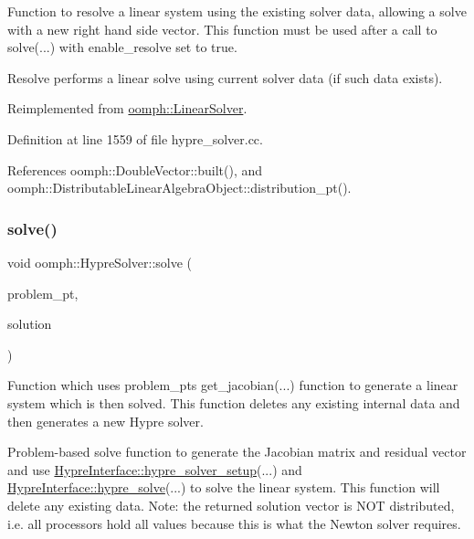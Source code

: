 Function to resolve a linear system using the existing solver data, allowing a solve with a new right hand side vector. This function must be used after a call to solve(...) with enable\+\_\+resolve set to true. 

Resolve performs a linear solve using current solver data (if such data exists). 

Reimplemented from \hyperlink{classoomph_1_1LinearSolver_a3b310d08333033edc119b2a5bd7dcbfb}{oomph\+::\+Linear\+Solver}.



Definition at line 1559 of file hypre\+\_\+solver.\+cc.



References oomph\+::\+Double\+Vector\+::built(), and oomph\+::\+Distributable\+Linear\+Algebra\+Object\+::distribution\+\_\+pt().

\mbox{\label{classoomph_1_1HypreSolver_a3a42a158a390f24d7d91ee78aa53e960}} 
\subsubsection{\texorpdfstring{solve()}{solve()}\hspace{0.1cm}{\footnotesize\ttfamily [1/2]}}
{\footnotesize\ttfamily void oomph\+::\+Hypre\+Solver\+::solve (\begin{DoxyParamCaption}\item[{\hyperlink{classoomph_1_1Problem}{Problem} $\ast$const \&}]{problem\+\_\+pt,  }\item[{\hyperlink{classoomph_1_1DoubleVector}{Double\+Vector} \&}]{solution }\end{DoxyParamCaption})\hspace{0.3cm}{\ttfamily [virtual]}}



Function which uses problem\+\_\+pt\textquotesingle{}s get\+\_\+jacobian(...) function to generate a linear system which is then solved. This function deletes any existing internal data and then generates a new Hypre solver. 

Problem-\/based solve function to generate the Jacobian matrix and residual vector and use \hyperlink{classoomph_1_1HypreInterface_afeddc250f9c56ac94e8c013c23a69deb}{Hypre\+Interface\+::hypre\+\_\+solver\+\_\+setup}(...) and \hyperlink{classoomph_1_1HypreInterface_a5cdd3f8621333e94d8a1004611bc6793}{Hypre\+Interface\+::hypre\+\_\+solve}(...) to solve the linear system. This function will delete any existing data. Note\+: the returned solution vector is N\+OT distributed, i.\+e. all processors hold all values because this is what the Newton solver requires. 

